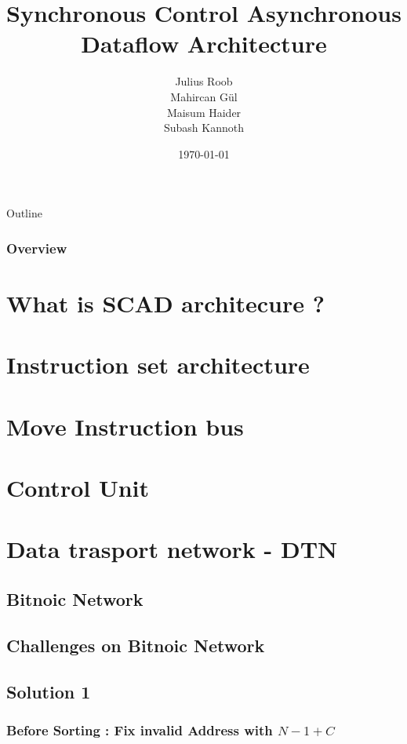 \documentclass{beamer}
\title[SCAD Architecture]{Synchronous Control Asynchronous Dataflow Architecture}
\author{Julius Roob \\ Mahircan G{\"u}l \\ Maisum Haider \\ Subash Kannoth }
\institute[TU Kaiserslautern]
{
	Technische Universit{\"a}t Kaiserslautern \\
	\medskip
}
\date{\today}
\begin{document}
\begin{frame}
  \titlepage
\end{frame}

\begin{frame}[allowframebreaks]{Outline}
\frametitle{Overview}
\tableofcontents
\end{frame}

\section{What is SCAD architecure ?}
  
  
\section{Instruction set architecture}
  
  
\section{Move Instruction bus}
  
  
\section{Control Unit}
  
  
\section{Data trasport network - DTN}
  
  
  \subsection{Bitnoic Network}
    
     \subsection{Challenges on Bitnoic Network}
    
      \subsection{Solution 1}
      
	\subsubsection{Before Sorting : Fix invalid Address with $N - 1 + C$ }
	
\end{document}
